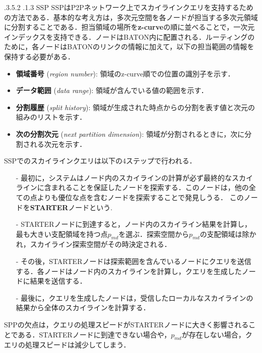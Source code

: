\documentclass{jarticle}
\makeatletter
\renewcommand{\subsubsection}{\@startsection{subsubsection}{3}{\z@}%
   {.3\Cvs \@plus.5\Cvs \@minus.2\Cvs}%
   {.1\Cvs \@plus.3\Cvs}%
   {\reset@font\normalsize\bfseries}}
\makeatother
\begin{document}
{\subsubsection{SSP}
SSPはP2Pネットワーク上でスカイラインクエリを支持するための方法である．基本的な考え方は，多次元空間を各ノードが担当する多次元領域に分割することである．担当領域の場所を\textbf{z-curve}の順に並べることで，一次元インデックスを支持できる．ノードはBATON内に配置される．ルーティングのために，各ノードはBATONのリンクの情報に加えて，以下の担当範囲の情報を保持する必要がある．
\begin{itemize}
  \item\textbf{領域番号} (\textit{region number}): 領域のz-curve順での位置の識別子を示す．
  \item\textbf{データ範囲} (\textit{data range}): 領域が含んでいる値の範囲を示す．
  \item\textbf{分割履歴} (\textit{split history}): 領域が生成された時点からの分割を表す値と次元の組みのリストを示す．
  \item\textbf{次の分割次元} (\textit{next partition dimension}): 領域が分割されるときに，次に分割される次元を示す．
\end{itemize}
SSPでのスカイラインクエリは以下の4ステップで行われる．
\begin{itemize}
  \item[-]最初に，システムはノード内のスカイラインの計算が必ず最終的なスカイラインに含まれることを保証したノードを探索する．このノードは，他の全ての点よりも優位な点を含むノードを探索することで発見しうる．
  このノードを\textbf{STARTER}ノードという.
  \item[-]STARTERノードに到達すると，ノード内のスカイライン結果を計算し，最も大きい支配領域を持つ点$p_{md}$を選ぶ．探索空間から$p_{md}$の支配領域は除かれ，スカイライン探索空間がその時決定される．
  \item[-]その後，STARTERノードは探索範囲を含んでいるノードにクエリを送信する．各ノードはノード内のスカイラインを計算し，クエリを生成したノードに結果を送信する．
  \item[-]最後に，クエリを生成したノードは，受信したローカルなスカイラインの結果から全体のスカイラインを計算する．
\end{itemize}
SPPの欠点は，クエリの処理スピードがSTARTERノードに大きく影響されることである．STARTERノードに到達できない場合や，$p_{md}$が存在しない場合，クエリの処理スピードは減少してしまう．

}
\end{document}
